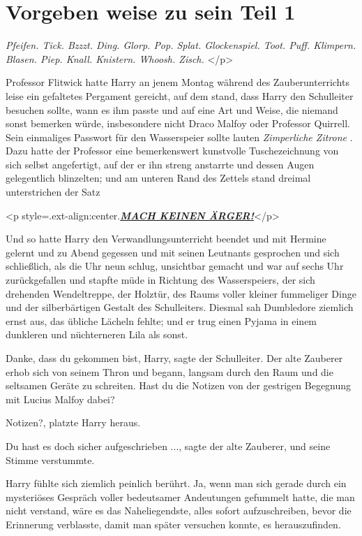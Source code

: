 \chapter{Vorgeben weise zu sein Teil 1}

\emph{Pfeifen. Tick. Bzzzt. Ding. Glorp. Pop. Splat. Glockenspiel. Toot. Puff.
Klimpern. Blasen. Piep. Knall. Knistern. Whoosh. Zisch.} </p>

Professor Flitwick hatte Harry an jenem Montag während des Zauberunterrichts
leise ein gefaltetes Pergament gereicht, auf dem stand, dass Harry den
Schulleiter besuchen sollte, wann es ihm passte und auf eine Art und Weise, die
niemand sonst bemerken würde, insbesondere nicht Draco Malfoy oder Professor
Quirrell. Sein einmaliges Passwort für den Wasserspeier sollte lauten
\emph{\glqq{}Zimperliche Zitrone\grqq{}} . Dazu hatte der Professor eine
bemerkenswert kunstvolle Tuschezeichnung von sich selbst angefertigt, auf der er
ihn streng anstarrte und dessen Augen gelegentlich blinzelten; und am unteren
Rand des Zettels stand dreimal unterstrichen der Satz

<p style=\grqq{}.ext-align:center\grqq{}.\textbf{\emph{\underline{MACH KEINEN
ÄRGER!}}}</p>

Und so hatte Harry den Verwandlungsunterricht beendet und mit Hermine gelernt
und zu Abend gegessen und mit seinen Leutnants gesprochen und sich schließlich,
als die Uhr neun schlug, unsichtbar gemacht und war auf sechs Uhr zurückgefallen
und stapfte müde in Richtung des Wasserspeiers, der sich drehenden Wendeltreppe,
der Holztür, des Raums voller kleiner fummeliger Dinge und der silberbärtigen
Gestalt des Schulleiters. Diesmal sah Dumbledore ziemlich ernst aus, das übliche
Lächeln fehlte; und er trug einen Pyjama in einem dunkleren und nüchterneren
Lila als sonst.

\glqq{}Danke, dass du gekommen bist, Harry\grqq{}, sagte der Schulleiter. Der
alte Zauberer erhob sich von seinem Thron und begann, langsam durch den Raum und
die seltsamen Geräte zu schreiten. \glqq{}Hast du die Notizen von der gestrigen
Begegnung mit Lucius Malfoy dabei?\grqq{}

\glqq{}Notizen?\grqq{}, platzte Harry heraus.

\glqq{}Du hast es doch sicher aufgeschrieben ...\grqq{}, sagte der alte Zauberer,
und seine Stimme verstummte.

Harry fühlte sich ziemlich peinlich berührt. Ja, wenn man sich gerade durch ein
mysteriöses Gespräch voller bedeutsamer Andeutungen gefummelt hatte, die man
nicht verstand, wäre es das Naheliegendste, alles sofort aufzuschreiben, bevor
die Erinnerung verblasste, damit man später versuchen konnte, es herauszufinden.

